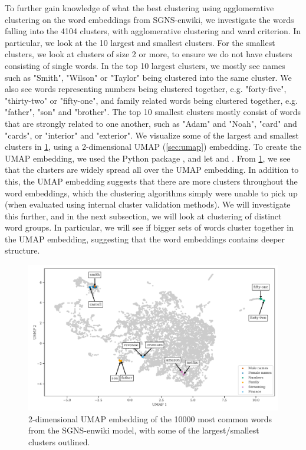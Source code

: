 To further gain knowledge of what the best clustering using agglomerative clustering on the word embeddings from SGNS-enwiki, we investigate the words falling into the 4104 clusters, with agglomerative clustering and ward criterion. In particular, we look at the 10 largest and smallest clusters. For the smallest clusters, we look at clusters of size 2 or more, to ensure we do not have clusters consisting of single words. In the top 10 largest clusters, we mostly see names such as "Smith", "Wilson" or "Taylor" being clustered into the same cluster. We also see words representing numbers being clustered together, e.g. "forty-five", "thirty-two" or "fifty-one", and family related words being clustered together, e.g. "father", "son" and "brother". The top 10 smallest clusters mostly consist of words that are strongly related to one another, such as "Adam" and "Noah", "card" and "cards", or "interior" and "exterior". We visualize some of the largest and smallest clusters in \cref{fig:cluster-analysis-agglomerative-2d-umap-top-clusters}, using a 2-dimensional UMAP (\cref{sec:umap}) embedding. To create the UMAP embedding, we used the  Python package \cite{mcinnes2018umap-software}, and let  and . From \cref{fig:cluster-analysis-agglomerative-2d-umap-top-clusters}, we see that the clusters are widely spread all over the UMAP embedding. In addition to this, the UMAP embedding suggests that there are more clusters throughout the word embeddings, which the clustering algorithms simply were unable to pick up (when evaluated using internal cluster validation methods). We will investigate this further, and in the next subsection, we will look at clustering of distinct word groups. In particular, we will see if bigger sets of words cluster together in the UMAP embedding, suggesting that the word embeddings contains deeper structure.
\begin{figure}
    \centering
    \includegraphics[width=\textwidth]{thesis/figures/cluster-analysis-agglomerative-2d-umap-top-clusters.pdf}
    \caption{2-dimensional UMAP embedding of the 10000 most common words from the SGNS-enwiki model, with some of the largest/smallest clusters outlined.}
    \label{fig:cluster-analysis-agglomerative-2d-umap-top-clusters}
\end{figure}


